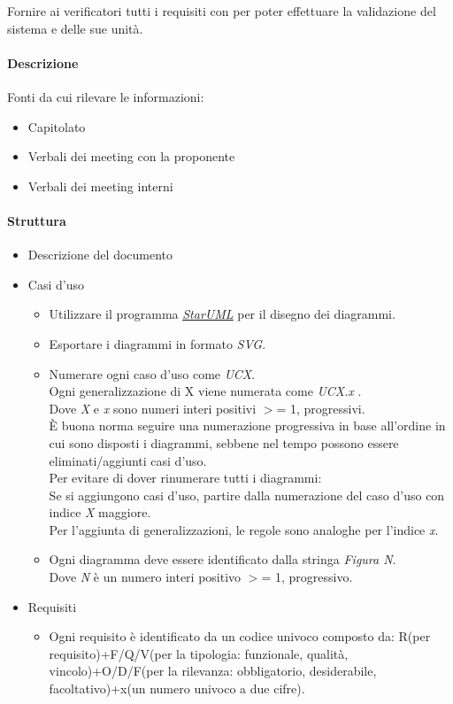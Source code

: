 \documentclass[a4paper, 12pt]{article}
\begin{document}
Fornire ai verificatori tutti i requisiti con per poter effettuare la validazione del sistema e delle sue unità.
\paragraph{Descrizione}
Fonti da cui rilevare le informazioni:
\begin{itemize}
	\item Capitolato
	\item Verbali dei meeting con la proponente
	\item Verbali dei meeting interni
\end{itemize}
\paragraph{Struttura}
\begin{itemize}
	\item Descrizione del documento
	\item Casi d'uso
	\begin{itemize}
		\item Utilizzare il programma \href{https://staruml.io/}{\textit{\underline{StarUML}}} per il disegno dei diagrammi.
		\item Esportare i diagrammi in formato \textit{SVG}.
		\item Numerare ogni caso d'uso come \textit{UCX}. \\
		Ogni generalizzazione di X viene numerata come \textit{UCX.x} .\\
		Dove \textit{X} e \textit{x} sono numeri interi positivi $>$= 1, progressivi.\\
		\`E buona norma seguire una numerazione progressiva in base all'ordine in cui sono 
		disposti i diagrammi, sebbene nel tempo possono essere eliminati/aggiunti casi d'uso.\\
		Per evitare di dover rinumerare tutti i diagrammi: \\
		Se si aggiungono casi d'uso, partire dalla numerazione del caso d'uso con indice \textit{X} maggiore.\\
		Per l'aggiunta di generalizzazioni, le regole sono analoghe per l'indice \textit{x}.
		\item Ogni diagramma deve essere identificato dalla stringa \textit{Figura N}.\\
		Dove \textit{N} è un numero interi positivo $>$= 1, progressivo.
	\end{itemize}
	\item Requisiti
	\begin{itemize}
		\item Ogni requisito è identificato da un codice univoco composto da: R(per requisito)+F/Q/V(per la tipologia: 
		funzionale, qualità, vincolo)+O/D/F(per la rilevanza: obbligatorio, desiderabile, 
		facoltativo)+x(un numero univoco a due cifre).
	\end{itemize}
\end{itemize}
\end{document}
